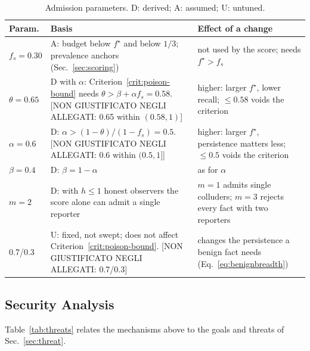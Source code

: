 \documentclass[journal]{IEEEtran}
\theoremstyle{definition}
\newcommand{\nongiust}[1]{{\color{red}[NON GIUSTIFICATO NEGLI ALLEGATI: #1]}}
\begin{document}
\begin{table}[t]
\centering
\caption{Admission parameters. D: derived; A: assumed; U: untuned.}
\label{tab:params}
\scriptsize
\begin{tabular}{@{}p{0.95cm}p{3.35cm}p{2.85cm}@{}}
\toprule
Param. & Basis & Effect of a change \\
\midrule
$f_s=0.30$ & A: budget below $f^\star$ and below $1/3$; prevalence anchors (Sec.~\ref{sec:scoring}) & not used by the score; needs $f^\star>f_s$ \\
$\theta=0.65$ & D with $\alpha$: Criterion~\ref{crit:poison-bound} needs $\theta>\beta+\alpha f_s=0.58$. \nongiust{0.65 within $(0.58,1)$} & higher: larger $f^\star$, lower recall; $\le0.58$ voids the criterion \\
$\alpha=0.6$ & D: $\alpha>(1-\theta)/(1-f_s)=0.5$. \nongiust{0.6 within $(0.5,1]$} & higher: larger $f^\star$, persistence matters less; $\le0.5$ voids the criterion \\
$\beta=0.4$ & D: $\beta=1-\alpha$ & as for $\alpha$ \\
$m=2$ & D: with $h\le1$ honest observers the score alone can admit a single reporter & $m=1$ admits single colluders; $m=3$ rejects every fact with two reporters \\
0.7/0.3 & U: fixed, not swept; does not affect Criterion~\ref{crit:poison-bound}. \nongiust{0.7/0.3} & changes the persistence a benign fact needs (Eq.~\ref{eq:benignbreadth}) \\
\bottomrule
\end{tabular}
\end{table}

\subsection{Security Analysis}
\label{subsec:security-analysis}
Table~\ref{tab:threats} relates the mechanisms above to the goals and threats of Sec.~\ref{sec:threat}.
\end{document}
